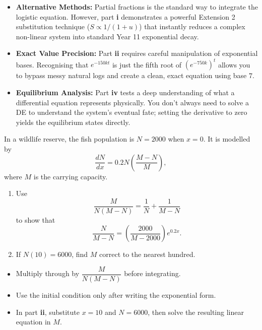 \begin{takeaways}
\begin{itemize}[leftmargin=*]
    \item \textbf{Alternative Methods:} Partial fractions is the standard way to integrate the logistic equation. However, part \textbf{i} demonstrates a powerful Extension 2 substitution technique ($S \propto 1/(1+u)$) that instantly reduces a complex non-linear system into standard Year 11 exponential decay. 
    \item \textbf{Exact Value Precision:} Part \textbf{ii} requires careful manipulation of exponential bases. Recognising that $e^{-150kt}$ is just the fifth root of $(e^{-750k})^t$ allows you to bypass messy natural logs and create a clean, exact equation using base $7$.
    \item \textbf{Equilibrium Analysis:} Part \textbf{iv} tests a deep understanding of what a differential equation represents physically. You don't always need to solve a DE to understand the system's eventual fate; setting the derivative to zero yields the equilibrium states directly.
\end{itemize}
\end{takeaways}

\begin{problem}
In a wildlife reserve, the fish population is $N=2000$ when $x=0$. It is modelled by
\[
\frac{dN}{dx}=0.2N\left(\frac{M-N}{M}\right),
\]
where $M$ is the carrying capacity.

\begin{enumerate}
    \item[\textbf{i}] Use
    \[
    \frac{M}{N(M-N)}=\frac1N+\frac1{M-N}
    \]
    to show that
    \[
    \frac{N}{M-N}=\left(\frac{2000}{M-2000}\right)e^{0.2x}.
    \]
    \item[\textbf{ii}] If $N(10)=6000$, find $M$ correct to the nearest hundred.
\end{enumerate}
\end{problem}

\begin{hint}
\begin{itemize}[leftmargin=*]
    \item Multiply through by $\dfrac{M}{N(M-N)}$ before integrating.
    \item Use the initial condition only after writing the exponential form.
    \item In part \textbf{ii}, substitute $x=10$ and $N=6000$, then solve the resulting linear equation in $M$.
\end{itemize}
\end{hint}

